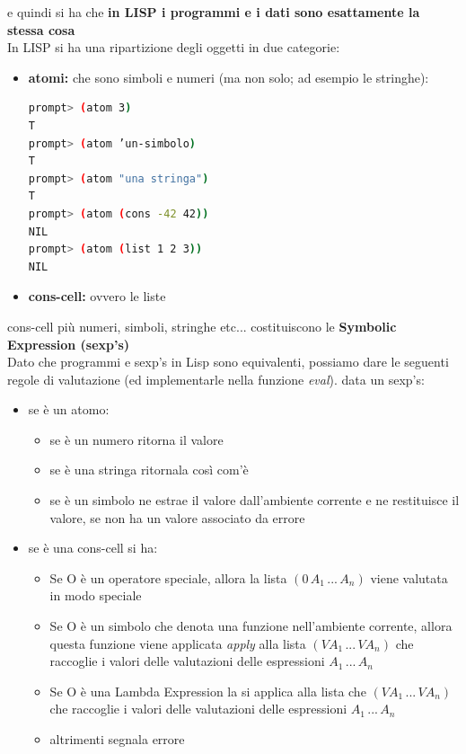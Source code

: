 \documentclass[a4paper,12pt, oneside]{book}
\begin{document}
e quindi si ha che \textbf{in LISP i programmi e i dati sono esattamente la stessa cosa}\\
In LISP si ha una ripartizione degli oggetti in due categorie:
\begin{itemize}
\item \textbf{atomi:} che sono simboli e numeri (ma non solo; ad esempio le stringhe):
\begin{shaded}
\begin{lstlisting}[language=bash]
prompt> (atom 3)
T
prompt> (atom ’un-simbolo)
T
prompt> (atom "una stringa")
T
prompt> (atom (cons -42 42))
NIL
prompt> (atom (list 1 2 3))
NIL
\end{lstlisting}
\end{shaded}
\item \textbf{cons-cell:} ovvero le liste
\end{itemize}
cons-cell più numeri, simboli, stringhe etc... costituiscono le \textbf{Symbolic Expression (sexp's)}\\
Dato che programmi e sexp’s in Lisp sono equivalenti, possiamo dare le seguenti regole di valutazione (ed implementarle nella funzione \textit{eval}). data un sexp's:
\begin{itemize}
\item se è un atomo:
\begin{itemize}
\item se è un numero ritorna il valore
\item se è una stringa ritornala così com'è
\item se è un simbolo ne estrae il valore dall'ambiente corrente e ne restituisce il valore, se non ha un valore associato da errore
\end{itemize}
\item se è una cons-cell si ha:
\begin{itemize}
\item Se O è un operatore speciale, allora la lista $(0\, A_1\,...\,A_n)$ viene valutata in modo speciale
\item Se O è un simbolo che denota una funzione nell'ambiente corrente, allora questa
funzione viene applicata \textit{apply} alla lista $(VA_1\,...\, VA_n)$ che raccoglie i
valori delle valutazioni delle espressioni $A_1\,...\,A_n$
\item Se O è una Lambda Expression la si applica alla lista che $(VA_1\,...\, VA_n)$
che raccoglie i valori delle valutazioni delle espressioni $A_1\,...\,A_n$
\item altrimenti segnala errore
\end{itemize}
\end{itemize}
\end{document}
